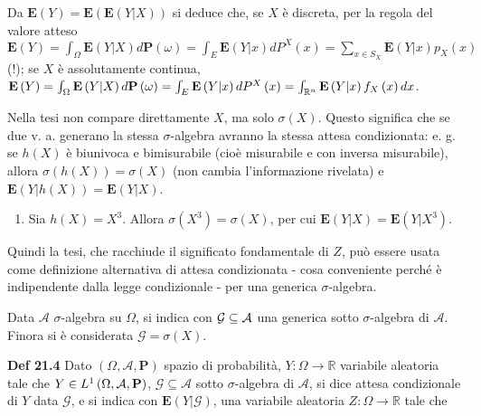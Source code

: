 \documentclass{article}
\begin{document}
Da $\mathbf{E}\left( Y\right) =\mathbf{E}\left( \mathbf{E}\left( Y|X\right)
\right) $ si deduce che, se $X$ \`{e} discreta, per la regola del valore
atteso $\mathbf{E}\left( Y\right) =\int_{\Omega }\mathbf{E}\left( Y|X\right)
d\mathbf{P}\left( \omega \right) =\int_{E}\mathbf{E}\left( Y|x\right)
dP^{X}\left( x\right) =\sum_{x\in S_{X}}\mathbf{E}\left( Y|x\right)
p_{X}\left( x\right) $ (!); se $X$ \`{e} assolutamente continua, $\mathbf{E}%
\left( Y\right) =\int_{\Omega }\mathbf{E}\left( Y|X\right) d\mathbf{P}\left(
\omega \right) =\int_{E}\mathbf{E}\left( Y|x\right) dP^{X}\left( x\right)
=\int_{%
\mathbb{R}
^{n}}\mathbf{E}\left( Y|x\right) f_{X}\left( x\right) dx$.

Nella tesi non compare direttamente $X$, ma solo $\sigma \left( X\right) $.
Questo significa che se due v. a. generano la stessa $\sigma $-algebra
avranno la stessa attesa condizionata: e. g. se $h\left( X\right) $ \`{e}
biunivoca e bimisurabile (cio\`{e} misurabile e con inversa misurabile),
allora $\sigma \left( h\left( X\right) \right) =\sigma \left( X\right) $
(non cambia l'informazione rivelata) e $\mathbf{E}\left( Y|h\left( X\right)
\right) =\mathbf{E}\left( Y|X\right) $.

\begin{enumerate}
\item Sia $h\left( X\right) =X^{3}$. Allora $\sigma \left( X^{3}\right)
=\sigma \left( X\right) $, per cui $\mathbf{E}\left( Y|X\right) =\mathbf{E}%
\left( Y|X^{3}\right) $.
\end{enumerate}

Quindi la tesi, che racchiude il significato fondamentale di $Z$, pu\`{o}
essere usata come definizione alternativa di attesa condizionata - cosa
conveniente perch\'{e} \`{e} indipendente dalla legge condizionale - per una
generica $\sigma $-algebra.

Data $\mathcal{A}$ $\sigma $-algebra su $\Omega $, si indica con $\mathcal{%
G\subseteq A}$ una generica sotto $\sigma $-algebra di $\mathcal{A}$. Finora
si \`{e} considerata $\mathcal{G}=\sigma \left( X\right) $.

\textbf{Def 21.4} Dato $\left( \Omega ,\mathcal{A},\mathbf{P}\right) $
spazio di probabilit\`{a}, $Y:\Omega \rightarrow 
\mathbb{R}
$ variabile aleatoria tale che $Y\in L^{1}\left( \Omega ,\mathcal{A},\mathbf{%
P}\right) $, $\mathcal{G\subseteq A}$ sotto $\sigma $-algebra di $\mathcal{A}
$, si dice attesa condizionale di $Y$ data $\mathcal{G}$, e si indica con $%
\mathbf{E}\left( Y|\mathcal{G}\right) $, una variabile aleatoria $Z:\Omega
\rightarrow 
\mathbb{R}
$ tale che
\end{document}
